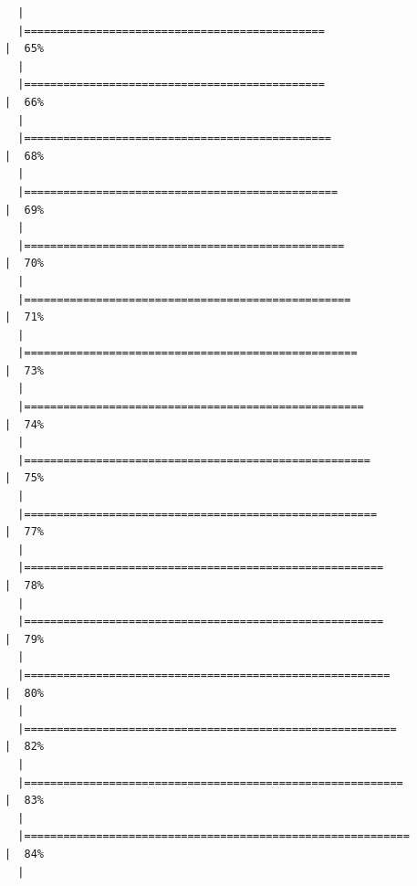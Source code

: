 \documentclass[
  letterpaper,
  DIV=11,
  numbers=noendperiod]{scrartcl}
\begin{document}
\begin{verbatim}
  |                                                                            
  |==============================================                        |  65%
  |                                                                            
  |==============================================                        |  66%
  |                                                                            
  |===============================================                       |  68%
  |                                                                            
  |================================================                      |  69%
  |                                                                            
  |=================================================                     |  70%
  |                                                                            
  |==================================================                    |  71%
  |                                                                            
  |===================================================                   |  73%
  |                                                                            
  |====================================================                  |  74%
  |                                                                            
  |=====================================================                 |  75%
  |                                                                            
  |======================================================                |  77%
  |                                                                            
  |=======================================================               |  78%
  |                                                                            
  |=======================================================               |  79%
  |                                                                            
  |========================================================              |  80%
  |                                                                            
  |=========================================================             |  82%
  |                                                                            
  |==========================================================            |  83%
  |                                                                            
  |===========================================================           |  84%
  |                                                                            

\end{verbatim}
\end{document}
